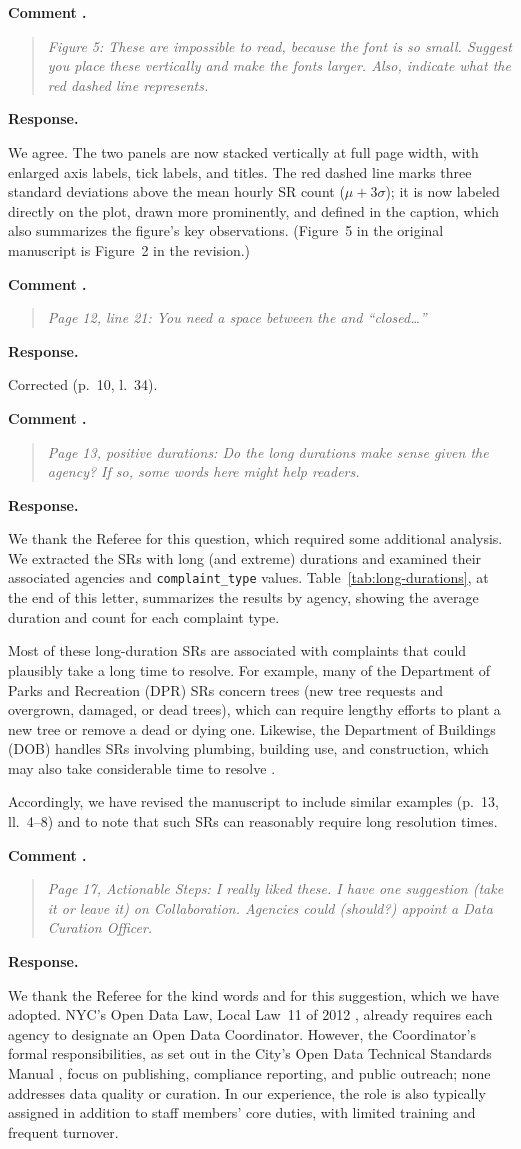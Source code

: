 \documentclass[11pt]{article}
\newcounter{refcomment}
\newcommand{\refcomment}[1]{%
  \FloatBarrier
  \stepcounter{refcomment}%
  \par\medskip
  \noindent\textbf{Comment \therefcomment.}
  \begin{quote}\itshape #1\end{quote}
  \noindent\textbf{Response.}~}
\begin{document}
\refcomment{Figure 5: These are impossible to read, because the font is
so small. Suggest you place these vertically and make the fonts larger.
Also, indicate what the red dashed line represents.}

We agree. The two panels are now stacked vertically at full page
width, with enlarged axis labels, tick labels, and titles. The red
dashed line marks three standard deviations above the mean hourly SR
count ($\mu + 3\sigma$); it is now labeled directly on the plot, drawn
more prominently, and defined in the caption, which also summarizes
the figure's key observations. (Figure~5 in the original manuscript
is Figure~2 in the revision.)

\refcomment{Page 12, line 21: You need a space between the and
``closed\ldots''}

Corrected (p.~10, l.~34).

\refcomment{Page 13, positive durations: Do the long durations make
sense given the agency? If so, some words here might help readers.}

We thank the Referee for this question, which required some additional
analysis. We extracted the SRs with long (and extreme) durations and
examined their associated agencies and \texttt{complaint\_type} values.
Table~\ref{tab:long-durations}, at the end of this letter, summarizes
the results by agency, showing the average duration and count for each
complaint type.

Most of these long-duration SRs are associated with complaints that
could plausibly take a long time to resolve. For example, many of the
Department of Parks and Recreation (DPR) SRs concern trees (new tree
requests and overgrown, damaged, or dead trees), which can require
lengthy efforts to plant a new tree or remove a dead or dying one.
Likewise, the Department of Buildings (DOB) handles SRs involving
plumbing, building use, and construction, which may also take
considerable time to resolve .

Accordingly, we have revised the manuscript to include 
similar examples (p.~13, ll.~4--8) and to note that such 
SRs can reasonably require long resolution times.

\refcomment{Page 17, Actionable Steps: I really liked these. I have one
suggestion (take it or leave it) on Collaboration. Agencies could
(should?) appoint a Data Curation Officer.}

We thank the Referee for the kind words and for this suggestion,
which we have adopted. NYC's Open Data Law, Local Law~11 of 2012
\citep{nyc_ll11}, already requires each agency to designate an Open
Data Coordinator. However, the Coordinator's formal responsibilities,
as set out in the City's Open Data Technical Standards Manual
\citep{nyc_tsm}, focus on publishing, compliance reporting, and public
outreach; none addresses data quality or curation. In our experience,
the role is also typically assigned in addition to staff members' core
duties, with limited training and frequent turnover.
\end{document}
